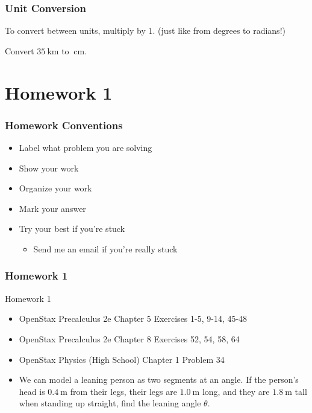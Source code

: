\documentclass[20pt]{beamer}
\begin{document}
\begin{frame}
	\frametitle{Unit Conversion}
	To convert between units, multiply by $1$. (just like from degrees to radians!)
	\begin{example}
		Convert $\SI{35}{\kilo\meter}$ to $\SI{}{\centi\meter}$.
	\end{example}
\end{frame}

\section{Homework 1}
\begin{frame}
	\frametitle{Homework Conventions}
	\begin{itemize}
		\item Label what problem you are solving
		\item Show your work
		\item Organize your work
		\item Mark your answer
		\item Try your best if you're stuck
		      \begin{itemize}
			      \item Send me an email if you're really stuck
		      \end{itemize}
	\end{itemize}
\end{frame}

\begin{frame}
	\frametitle{Homework 1}
	\begin{block}{Homework 1}
		\begin{itemize}
			\item OpenStax Precalculus 2e Chapter 5 Exercises 1-5, 9-14, 45-48
			\item OpenStax Precalculus 2e Chapter 8 Exercises 52, 54, 58, 64
			\item OpenStax Physics (High School) Chapter 1 Problem 34
			\item We can model a leaning person as two segments at an angle. If the person's head is $\SI{0.4}{\meter}$ from their legs, their legs are $\SI{1.0}{\meter}$ long, and they are $\SI{1.8}{\meter}$ tall when standing up straight, find the leaning angle $\theta$.
			      \begin{figure}[ht]
				      \centering
				      \label{fig:leaningproblem}
			      \end{figure}
		\end{itemize}
	\end{block}
\end{frame}
\end{document}
